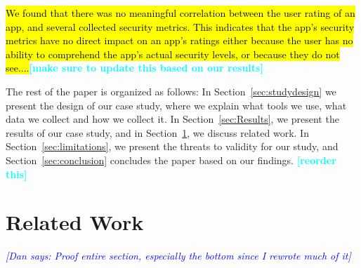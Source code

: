 \documentclass{sig-alternate-05-2015}
\newcommand{\todo}[1]{\textcolor{cyan}{\textbf{[#1]}}}
\newcommand{\dan}[1]{\textcolor{blue}{{\it [Dan says: #1]}}}
\begin{document}

\hl{We found that there was no meaningful correlation between the user rating of an app, and several collected security metrics. This indicates that the app's security metrics have no direct impact on an app's ratings either because the user has no ability to comprehend the app's actual security levels, or because they do not see....}\todo{make sure to update this based on our results}




The rest of the paper is organized as follows: In Section~\ref{sec:studydesign} we present the design of our case study, where we explain what tools we use, what data we collect and how we collect it. In Section~\ref{sec:Results}, we present the results of our case study, and in Section~\ref{sec:relatedwork}, we discuss related work. In Section~\ref{sec:limitations}, we present the threats to validity for our study, and Section~\ref{sec:conclusion} concludes the paper based on our findings.
\todo{reorder this}




\section{Related Work}
\label{sec:relatedwork}
\dan{Proof entire section, especially the bottom since I rewrote much of it}
\end{document}
